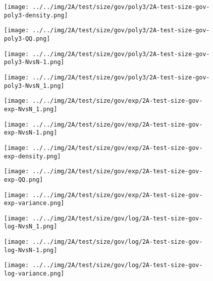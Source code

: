 \begin{figure}[H]
\centering	\texttt{[image: ../../img/2A/test/size/gov/poly3/2A-test-size-gov-poly3-density.png]}
\end{figure}
\begin{figure}[H]
\centering	\texttt{[image: ../../img/2A/test/size/gov/poly3/2A-test-size-gov-poly3-QQ.png]}
\end{figure}
\begin{figure}[H]
\centering	\texttt{[image: ../../img/2A/test/size/gov/poly3/2A-test-size-gov-poly3-NvsN-1.png]}
\end{figure}
\begin{figure}[H]
\centering	\texttt{[image: ../../img/2A/test/size/gov/poly3/2A-test-size-gov-poly3-NvsN\_1.png]}
\end{figure}
\begin{figure}[H]
\centering	\texttt{[image: ../../img/2A/test/size/gov/exp/2A-test-size-gov-exp-NvsN\_1.png]}
\end{figure}
\begin{figure}[H]
\centering	\texttt{[image: ../../img/2A/test/size/gov/exp/2A-test-size-gov-exp-NvsN-1.png]}
\end{figure}
\begin{figure}[H]
\centering	\texttt{[image: ../../img/2A/test/size/gov/exp/2A-test-size-gov-exp-density.png]}
\end{figure}
\begin{figure}[H]
\centering	\texttt{[image: ../../img/2A/test/size/gov/exp/2A-test-size-gov-exp-QQ.png]}
\end{figure}
\begin{figure}[H]
\centering	\texttt{[image: ../../img/2A/test/size/gov/exp/2A-test-size-gov-exp-variance.png]}
\end{figure}
\begin{figure}[H]
\centering	\texttt{[image: ../../img/2A/test/size/gov/log/2A-test-size-gov-log-NvsN\_1.png]}
\end{figure}
\begin{figure}[H]
\centering	\texttt{[image: ../../img/2A/test/size/gov/log/2A-test-size-gov-log-NvsN-1.png]}
\end{figure}
\begin{figure}[H]
\centering	\texttt{[image: ../../img/2A/test/size/gov/log/2A-test-size-gov-log-variance.png]}
\end{figure}
